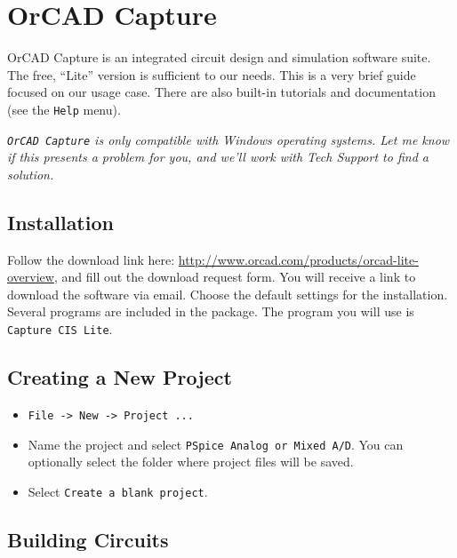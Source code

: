 \documentclass[11pt]{article}
\begin{document}
\section{OrCAD Capture}
\label{sec:orcad}

OrCAD Capture is an integrated circuit design and simulation software
suite. The free, ``Lite'' version is sufficient to our needs. This is
a very brief guide focused on our usage case. There are also built-in
tutorials and documentation (see the \texttt{Help} menu).

\emph{\texttt{OrCAD Capture} is only compatible with Windows
  operating systems. Let me know if this presents a problem for you,
  and we'll work with Tech Support to find a solution.}

\subsection{Installation}

Follow the download link here:
\url{http://www.orcad.com/products/orcad-lite-overview}, and fill out
the download request form. You will receive a link to download the
software via email. Choose the default settings for the
installation. Several programs are included in the package. The
program you will use is \texttt{Capture CIS Lite}. 

\subsection{Creating a New Project}

\begin{itemize}
\item \texttt{File -> New -> Project ...}

\item Name the project and select \texttt{PSpice Analog or Mixed
  A/D}. You can optionally select the folder where project files will
  be saved.

\item Select \texttt{Create a blank project}.
\end{itemize}

\subsection{Building Circuits}
\end{document}
